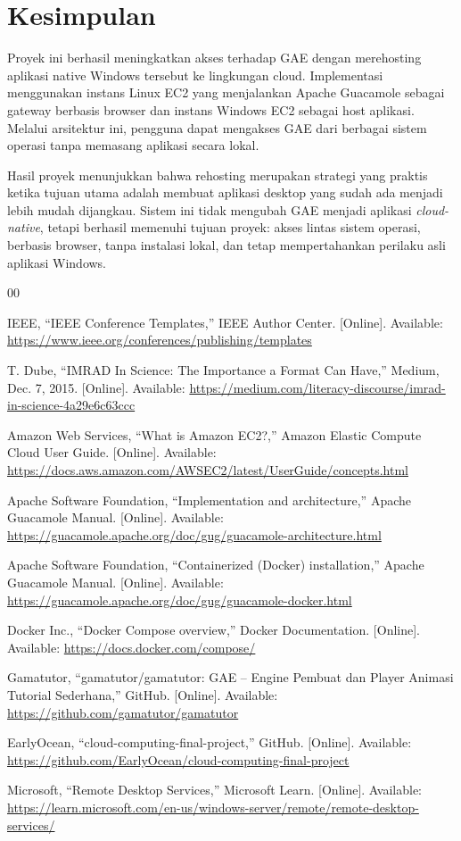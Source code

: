 \documentclass[conference]{IEEEtran}
\begin{document}
\section{Kesimpulan}

Proyek ini berhasil meningkatkan akses terhadap GAE dengan merehosting aplikasi native Windows tersebut ke lingkungan cloud. Implementasi menggunakan instans Linux EC2 yang menjalankan Apache Guacamole sebagai gateway berbasis browser dan instans Windows EC2 sebagai host aplikasi. Melalui arsitektur ini, pengguna dapat mengakses GAE dari berbagai sistem operasi tanpa memasang aplikasi secara lokal.

Hasil proyek menunjukkan bahwa rehosting merupakan strategi yang praktis ketika tujuan utama adalah membuat aplikasi desktop yang sudah ada menjadi lebih mudah dijangkau. Sistem ini tidak mengubah GAE menjadi aplikasi \textit{cloud-native}, tetapi berhasil memenuhi tujuan proyek: akses lintas sistem operasi, berbasis browser, tanpa instalasi lokal, dan tetap mempertahankan perilaku asli aplikasi Windows.

\begin{thebibliography}{00}

IEEE, ``IEEE Conference Templates,'' IEEE Author Center. [Online]. Available: \url{https://www.ieee.org/conferences/publishing/templates}

T. Dube, ``IMRAD In Science: The Importance a Format Can Have,'' Medium, Dec. 7, 2015. [Online]. Available: \url{https://medium.com/literacy-discourse/imrad-in-science-4a29e6c63ccc}

Amazon Web Services, ``What is Amazon EC2?,'' Amazon Elastic Compute Cloud User Guide. [Online]. Available: \url{https://docs.aws.amazon.com/AWSEC2/latest/UserGuide/concepts.html}

Apache Software Foundation, ``Implementation and architecture,'' Apache Guacamole Manual. [Online]. Available: \url{https://guacamole.apache.org/doc/gug/guacamole-architecture.html}

Apache Software Foundation, ``Containerized (Docker) installation,'' Apache Guacamole Manual. [Online]. Available: \url{https://guacamole.apache.org/doc/gug/guacamole-docker.html}

Docker Inc., ``Docker Compose overview,'' Docker Documentation. [Online]. Available: \url{https://docs.docker.com/compose/}

Gamatutor, ``gamatutor/gamatutor: GAE -- Engine Pembuat dan Player Animasi Tutorial Sederhana,'' GitHub. [Online]. Available: \url{https://github.com/gamatutor/gamatutor}

EarlyOcean, ``cloud-computing-final-project,'' GitHub. [Online]. Available: \url{https://github.com/EarlyOcean/cloud-computing-final-project}

Microsoft, ``Remote Desktop Services,'' Microsoft Learn. [Online]. Available: \url{https://learn.microsoft.com/en-us/windows-server/remote/remote-desktop-services/}

\end{thebibliography}
\end{document}
